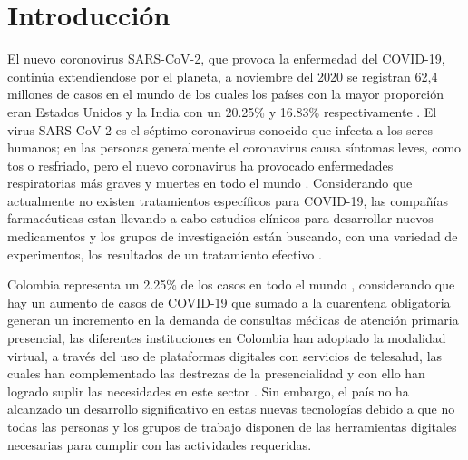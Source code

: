 \documentclass[12pt]{article}
\begin{document}
\newpage

\listoffigures

\newpage




\newpage


\section{Introducción}

El nuevo coronovirus SARS-CoV-2, que provoca la enfermedad del COVID-19, contin\'ua extendiendose por el planeta,
a noviembre del 2020 se registran 62,4 millones de casos en el mundo de los cuales los pa\'ises con la mayor proporci\'on eran Estados Unidos y la  India con un 20.25\% y 16.83\% respectivamente \cite{6}. El virus SARS-CoV-2 es el s\'eptimo coronavirus conocido que infecta a los seres humanos; en las personas generalmente el coronavirus causa s\'intomas leves, como tos o resfriado, pero el nuevo coronavirus ha provocado enfermedades respiratorias m\'as graves y muertes en todo el mundo \cite{7}. Considerando que actualmente no existen tratamientos espec\'ificos para COVID-19, las compa\~{n}\'ias farmac\'euticas estan llevando a cabo estudios cl\'inicos para desarrollar nuevos medicamentos y los grupos de investigaci\'on est\'an buscando, con una variedad de experimentos, los resultados de un tratamiento efectivo \cite{8}.

Colombia representa un 2.25\% de los casos en todo el mundo \cite{8}, considerando que hay un aumento de casos de COVID-19 que sumado a la cuarentena obligatoria generan un incremento en la demanda de consultas m\'edicas de atenci\'on primaria presencial, las diferentes instituciones en Colombia han adoptado la modalidad virtual, a trav\'es del  uso de plataformas digitales con servicios de telesalud, las cuales han complementado las destrezas de la presencialidad y con ello han logrado suplir las necesidades en este sector \cite{9}. Sin embargo, el pa\'is no ha alcanzado un desarrollo significativo en estas nuevas tecnolog\'ias debido a que no todas las personas y los grupos de trabajo disponen de las herramientas digitales necesarias para cumplir con las actividades requeridas. 
\end{document}
